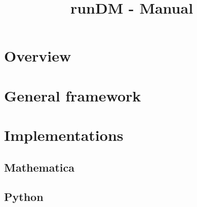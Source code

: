 \documentclass[notitlepage,12pt]{article}
\begin{document}
\title{runDM - Manual}
\maketitle


\section{Overview}

\section{General framework}

\section{Implementations}

\subsection{Mathematica}

\subsection{Python}
\end{document}
